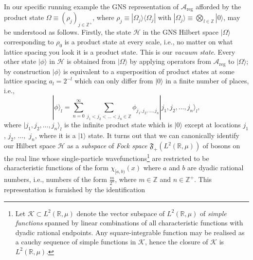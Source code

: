 \documentclass[11pt]{amsart}
\theoremstyle{plain}%
\theoremstyle{definition}
\theoremstyle{remark}
\begin{document}
In our specific running example the GNS representation of $\mathcal{A}_{\text{reg}}$ afforded by the product state  $\Omega \equiv (\rho_j)_{j\in \mathbb{Z}^+}$, where $\rho_j \equiv |\Omega_j\rangle\langle \Omega_j|$ with $|\Omega_j\rangle \equiv \bigotimes_{l\in \mathbb{Z}} |0\rangle$, may be understood as follows. Firstly, the state $\mathcal{H}$ in the GNS Hilbert space  $|\Omega\rangle$ corresponding to $\rho_0$ is a product state at every scale, i.e., no matter on what lattice spacing you look it is a product state. This is our \emph{vacuum state}. Every other state $|\phi\rangle$ in $\mathcal{H}$ is obtained from $|\Omega\rangle$ by applying operators from $\mathcal{A}_{\text{reg}}$ to $|\Omega\rangle$; by construction $|\phi\rangle$ is equivalent to a superposition of product states at some lattice spacing $a_l = 2^{-l}$ which can only differ from $|0\rangle$ in a finite number of places, i.e.,  
\begin{equation}
	|\phi\rangle_l = \sum_{n=0}^\infty\sum_{j_1 < j_2 < \ldots< j_n \in \mathbb{Z}} \phi_{j_1,j_2, \ldots, j_n}|j_1,j_2, \ldots, j_n\rangle_l,
\end{equation} 
where $|j_1,j_2, \ldots, j_n\rangle_l$ is the infinite product state which is $|0\rangle$ except at locations $j_1$, $j_2$, $\ldots,$ $j_n$, where it is a $|1\rangle$ state. 
It turns out that we can canonically identify our Hilbert space $\mathcal{H}$ as a \emph{subspace} of \emph{Fock space} $\mathfrak{F}_+(L^2(\mathbb{R}, \mu))$ of bosons on the real line whose single-particle wavefunctions\footnote{Let $\mathcal{K}\subset L^2(\mathbb{R}, \mu)$ denote the vector subspace of $L^2(\mathbb{R}, \mu)$ of \emph{simple functions} spanned by linear combinations of all characteristic functions with dyadic rational endpoints. Any square-integrable function may be realised as a cauchy sequence of simple functions in $\mathcal{K}$, hence the closure of $\mathcal{K}$ is $L^2(\mathbb{R}, \mu)$.} are restricted to be characteristic functions of the form $\chi_{[a,b)}(x)$ where $a$ and $b$ are dyadic rational numbers, i.e., numbers of the form $\frac{m}{2^n}$, where $m\in \mathbb{Z}$ and $n\in \mathbb{Z}^{+}$. This representation is furnished by the identification
\end{document}
